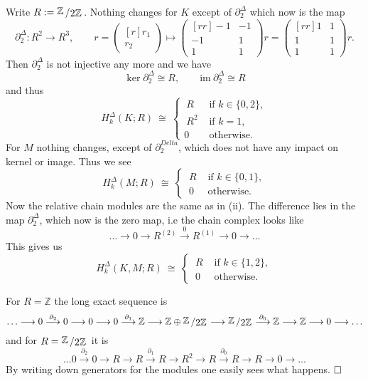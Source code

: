 \documentclass[11pt]{book}
\numberwithin{dummy}{section}
\theoremstyle{nonumberbreak}
\newenvironment{sol}[1][]{\ifthenelse{\equal{#1}{}}{\solution}{\solution[#1]}\rm}{\endsolution}
\newenvironment{prob}[1][]{\ifthenelse{\equal{#1}{}}{\problem}{\problem[#1]}\rm}{\endproblem}
\newcommand{\la}{\longrightarrow}
\newcommand{\Z}{\mathbb{Z}}
\newcommand{\slant}[2]{{\raisebox{.1em}{$#1$}\left/\raisebox{-.1em}{$#2$}\right.}}
\begin{document}
\begin{spacing}{1.4}
\begin{prob}
\begin{sol}
\begin{compactenum}
\item Write $R:= \slant{\Z}{2\Z}$. Nothing changes for $K$ except of $\partial_2^{\Delta}$ which now is the map
$$\partial_2^{\Delta}: R^2 \la R^3, \qquad r=\begin{pmatrix}[r] r_1 \\[-6pt] r_2 \end{pmatrix} \mapsto \begin{pmatrix}[rr] -1 & -1 \\[-6pt] -1 & 1 \\[-6pt] 1 & 1 \end{pmatrix} r = \begin{pmatrix}[rr] 1 & 1 \\[-6pt] 1 & 1 \\[-6pt] 1 & 1 \end{pmatrix} r.$$
Then $\partial_2^{\Delta}$ is not injective any more and we have 
$$\ker \partial_2^{\Delta} \cong R, \qquad \mathrm{im} \ \partial_2^{\Delta} \cong R$$
and thus 
$$H_k^{\Delta}(K;R) \ \cong \ \begin{cases} \ R & \textrm{ if } k \in \{0,2\}, \\ \ R^2 & \textrm{ if }k=1, \\ 0 & \textrm{ otherwise.} \end{cases}$$
For $M$ nothing changes, except of $\partial_2^{Delta}$, which does not have any impact on kernel or image. Thus we see
$$H_k^{\Delta}(M;R) \ \cong \ \begin{cases} \ R & \textrm{ if } k \in \{0,1\} ,\\ \ 0 & \textrm{ otherwise.} \end{cases}$$
Now the relative chain modules are the same as in (ii). The difference lies in the map $\partial_2^{\Delta}$, which now is the zero map, i.e the chain complex looks like 
$$\ldots \la 0 \la R^{(2)} \overset{0}{\la} R^{(1)} \la 0 \la \ldots$$
This gives us 
$$H_k^{\Delta}(K,M;R) \ \cong \ \begin{cases} \ R & \textrm{ if } k\in \{1,2\}, \\ \ 0 & \textrm{ otherwise.} \end{cases} $$

\item For $R=\Z$ the long exact sequence is
$$\ldots \la 0  \overset{\partial_2}{\la} 0  \la 0 \la  0 \overset{\partial_1}{\la} \Z \la \Z \oplus \slant{\Z}{2\Z} \la \slant{\Z}{2\Z} \overset{\partial_0}{\la} \Z \la \Z \la 0 \la \ldots$$
and for $R= \slant{\Z}{2\Z}$ it is
$$\ldots 0 \overset{\partial_2}{\la} 0 \la R \la R \overset{\partial_1}{\la} R \la R^2 \la R \overset{\partial_0}{\la} R \la R \la 0 \la \ldots $$
By writing down generators for the modules one easily sees what happens. $\hfill \Box$
\end{compactenum}


\end{sol}
\end{prob}
\end{spacing}
\end{document}
